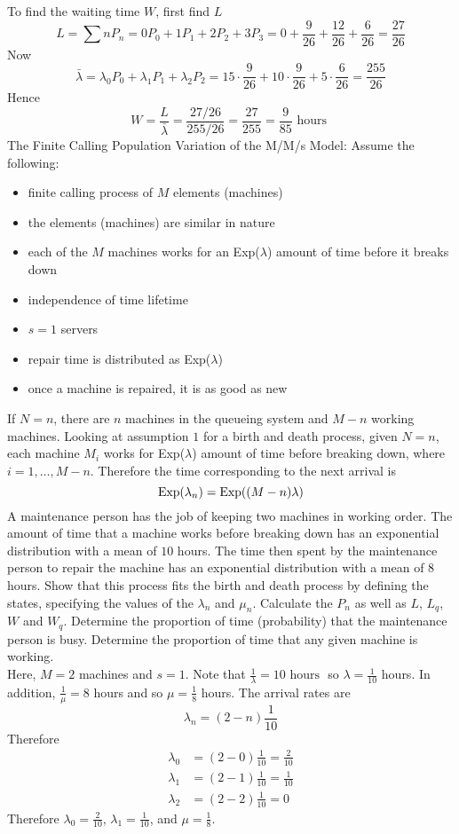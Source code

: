 \documentclass[12pt]{article}
\begin{document}
To find the waiting time $W$, first find $L$
$$ L = \sum nP_n = 0P_0 + 1P_1 + 2P_2 + 3P_3 = 0 + \frac{9}{26} + \frac{12}{26} + \frac{6}{26} = \frac{27}{26} $$ 
Now $$\bar{\lambda} = \lambda_0P_0 + \lambda_1P_1 + \lambda_2P_2 = 15 \cdot \frac{9}{26} + 10 \cdot \frac{9}{26} + 5 \cdot \frac{6}{26} = \frac{255}{26} $$ 
Hence $$W = \frac{L}{\bar{\lambda}} = \frac{27/26}{255/26} = \frac{27}{255} = \frac{9}{85} \text{ hours } $$ 
The Finite Calling Population Variation of the M/M/s Model: Assume the following: \begin{itemize}
\item finite calling process of $M$ elements (machines)
\item the elements (machines) are similar in nature 
\item each of the $M$ machines works for an Exp($\lambda$) amount of time before it breaks down 
\item independence of time lifetime 
\item $s=1$ servers 
\item repair time is distributed as Exp($\lambda$) 
\item once a machine is repaired, it is as good as new \end{itemize} 
If $N=n$, there are $n$ machines in the queueing system and $M-n$ working machines. Looking at assumption $1$ for a birth and death process, given $N=n$, each machine $M_i$ works for Exp($\lambda$) amount of time before breaking down, where $i = 1, \dots, M-n$. Therefore the time corresponding to the next arrival is $$\text{Exp}( \lambda_n ) = \text{Exp}( (M-n)\lambda ) $$ 
A maintenance person has the job of keeping two machines in working order. The amount of time that a machine works before breaking down has an exponential distribution with a mean of $10$ hours. The time then spent by the maintenance person to repair the machine has an exponential distribution with a mean of $8$ hours. Show that this process fits the birth and death process by defining the states, specifying the values of the $\lambda_n$ and $\mu_n$. Calculate the $P_n$ as well as $L$, $L_q$, $W$ and $W_q$. Determine the proportion of time (probability) that the maintenance person is busy. Determine the proportion of time that any given machine is working. \\
Here, $M = 2$ machines and $s=1$. Note that $\frac{1}{\lambda} = 10 \text{ hours }$ so $\lambda = \frac{1}{10}$ hours. In addition, $\frac{1}{\mu} = 8$ hours and so $\mu = \frac{1}{8}$ hours. The arrival rates are $$\lambda_n = (2-n)\frac{1}{10}$$ Therefore $$\begin{aligned} \lambda_0 &= (2-0)\frac{1}{10} = \frac{2}{10} \\ \lambda_1 &= (2-1)\frac{1}{10} = \frac{1}{10} \\ \lambda_2 &= (2-2)\frac{1}{10} = 0 \end{aligned} $$ Therefore $\lambda_0 = \frac{2}{10}$, $\lambda_1 = \frac{1}{10}$, and $\mu = \frac{1}{8}$. 
\end{document}

